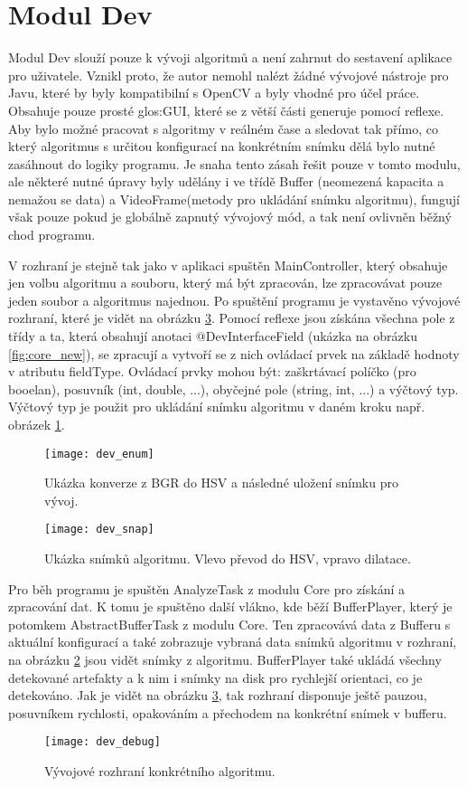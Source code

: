 \section{Modul Dev}
Modul Dev slouží pouze k vývoji algoritmů a není zahrnut do sestavení aplikace pro uživatele. Vznikl proto, že autor nemohl nalézt žádné vývojové nástroje pro Javu, které by byly kompatibilní s OpenCV a byly vhodné pro účel práce. Obsahuje pouze prosté \gls{glos:GUI}, které se z větší části generuje pomocí reflexe. Aby bylo možné pracovat s algoritmy v reálném čase a sledovat tak přímo, co který algoritmus s určitou konfigurací na konkrétním snímku dělá bylo nutné zasáhnout do logiky programu. Je snaha tento zásah řešit pouze v tomto modulu, ale některé nutné úpravy byly udělány i ve třídě Buffer (neomezená kapacita a nemažou se data) a VideoFrame(metody pro ukládání snímku algoritmu), fungují však pouze pokud je globálně zapnutý vývojový mód, a tak není ovlivněn běžný chod programu.

V rozhraní je stejně tak jako v aplikaci spuštěn MainController, který obsahuje jen volbu algoritmu a souboru, který má být zpracován, lze zpracovávat pouze jeden soubor a algoritmus najednou. Po spuštění programu je vystavěno vývojové rozhraní, které je vidět na obrázku \ref{fig:dev_debug}. Pomocí reflexe jsou získána všechna pole z třídy a ta, která obsahují anotaci @DevInterfaceField (ukázka na obrázku \ref{fig:core_new}), se zpracují a vytvoří se z nich ovládací prvek na základě hodnoty v atributu fieldType. Ovládací prvky mohou být: zaškrtávací políčko (pro booelan), posuvník (int, double, ...), obyčejné pole (string, int, ...) a výčtový typ. Výčtový typ je použit pro ukládání snímku algoritmu v daném kroku např. obrázek \ref{fig:dev_enum}.

\begin{figure}[h]
	\texttt{[image: dev\_enum]}
	\centering
	\caption{Ukázka konverze z BGR do HSV a následné uložení snímku pro vývoj. \label{fig:dev_enum}}
\end{figure} 
\FloatBarrier

\begin{figure}[h]
	\texttt{[image: dev\_snap]}
	\centering
	\caption{Ukázka snímků algoritmu. Vlevo převod do HSV, vpravo dilatace. \label{fig:dev_snap}}
\end{figure} 
\FloatBarrier

Pro běh programu je spuštěn AnalyzeTask z modulu Core pro získání a zpracování dat. K tomu je spuštěno další vlákno, kde běží BufferPlayer, který je potomkem AbstractBufferTask z modulu Core. Ten zpracovává data z Bufferu s aktuální konfigurací a také zobrazuje vybraná data snímků algoritmu v rozhraní, na obrázku \ref{fig:dev_snap} jsou vidět snímky z algoritmu. BufferPlayer také ukládá všechny detekované artefakty a k nim i snímky na disk pro rychlejší orientaci, co je detekováno. Jak je vidět na obrázku \ref{fig:dev_debug}, tak rozhraní disponuje ještě pauzou, posuvníkem rychlosti, opakováním a přechodem na konkrétní snímek v bufferu.



\begin{figure}[h]
	\texttt{[image: dev\_debug]}
	\centering
	\caption{Vývojové rozhraní konkrétního algoritmu. \label{fig:dev_debug}}
\end{figure} 
\FloatBarrier

